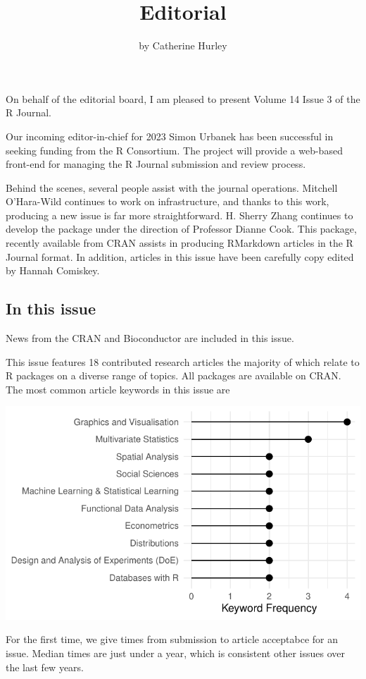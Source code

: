 \title{Editorial}
\author{by Catherine Hurley}

\maketitle


On behalf of the editorial board, I am pleased to present Volume 14 Issue 3 of the R Journal.

\noindent Our incoming editor-in-chief for 2023 Simon Urbanek has been successful in seeking funding from the R Consortium. The project will provide a web-based front-end for managing the R Journal submission and review process.

\noindent Behind the scenes, several people assist with the journal operations. Mitchell O'Hara-Wild continues to work on infrastructure, and thanks to this work, producing a new issue is far more straightforward. H. Sherry Zhang continues to develop the  package under the direction of Professor Dianne Cook. This package, recently available from CRAN assists in producing RMarkdown articles in the R Journal format. In addition, articles in this issue have been carefully copy edited by Hannah Comiskey.

\hypertarget{in-this-issue}{%
\subsection{In this issue}\label{in-this-issue}}

News from the CRAN and Bioconductor are included in this issue.

\noindent This issue features 18 contributed research articles the majority of which relate to R packages
on a diverse range of topics. All packages are available on CRAN. The most common article keywords in this issue are

\begin{center}\includegraphics[width=0.5\linewidth]{figs/keywords-1} \end{center}

\noindent For the first time, we give times from submission to article acceptabce for an issue. Median times are just under a year, which is consistent other issues over the last few years.

